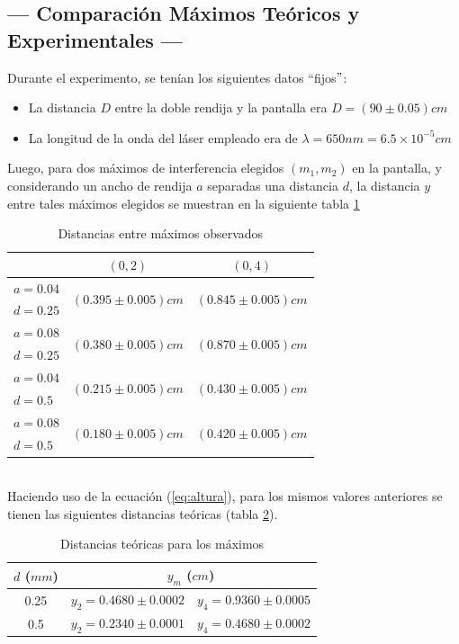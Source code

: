 \documentclass[12pt,a4paper]{article}
\begin{document}
\subsection{--- Comparación Máximos Teóricos y Experimentales ---} %
\label{sub:comparacion}
	 Durante el experimento, se tenían los siguientes datos ``fijos$"$:
	 \begin{itemize}
	 	\item La distancia $ D $ entre la doble rendija y la pantalla era $ D=(90\pm 0.05) cm$
	 	\item La longitud de la onda del láser empleado era de $ \lambda=650 nm=6.5\times 10^{-5}cm $
	 \end{itemize}
	 \newpage
 	Luego, para dos máximos de interferencia elegidos $ (m_1, m_2) $ en la pantalla, y considerando un ancho de rendija $ a $ separadas una distancia $ d $, la distancia $ y $ entre tales máximos elegidos se muestran en la siguiente tabla \ref{tab:distancias}
 	\begin{table}[!htb]
 		\centering
 		\caption{Distancias entre máximos observados}
 		\begin{tabular}{|c|c|c|}
 			\hline
			\backslashbox{$ a, d $ (\(mm\))}{$ (m_1,m_2) $}& $ (0,2) $ & $ (0,4) $ \\
 			\hline
 			$ a=0.04 $ & \multirow{2}{*}{$ (0.395\pm 0.005) cm $} & \multirow{2}{*}{$ (0.845\pm 0.005) cm $} \\ 		
 			$ d=0.25 $ &  & \\ 
 			\hline
 			$ a=0.08 $& \multirow{2}{*}{$ (0.380\pm 0.005) cm $} & \multirow{2}{*}{$ (0.870\pm 0.005) cm $} \\
 			$ d=0.25 $&  &  \\
 			\hline
 			$ a=0.04 $          & \multirow{2}{*}{$ (0.215\pm 0.005) cm $} & \multirow{2}{*}{$ (0.430\pm 0.005) cm $} \\ 		
 			$ d=0.5\phantom{0} $&  &  \\	
 			\hline
 			$ a=0.08 $           & \multirow{2}{*}{$ (0.180 \pm 0.005) cm $} & \multirow{2}{*}{$ (0.420 \pm 0.005) cm $} \\
 			$ d=0.5\phantom{0} $ &  &  \\
 			\hline
 		\end{tabular}
 		\label{tab:distancias}
 	\end{table}\\
		Haciendo uso de la ecuación (\ref{eq:altura}), para los mismos valores anteriores se tienen las siguientes distancias teóricas (tabla \ref{tab:disteo}).
 	\begin{table}[hbtp!]
 		\centering
 		\caption{Distancias teóricas para los máximos}
 		\begin{tabular}{|c|c|c|}
 			\hline
			$ d $ (\(mm\)) & \multicolumn{2}{c|}{$ y_m $ (\(cm\))}  \\
 			\hline
 			0.25 & $ y_2=0.4680\pm 0.0002 $ & $ y_4=0.9360\pm0.0005 $ \\
 			\hline
 			0.5 & $ y_2=0.2340\pm 0.0001 $ & $ y_4=0.4680\pm0.0002 $  \\
 			\hline
 		\end{tabular}
 		\label{tab:disteo}
 	\end{table}\\
\end{document}
